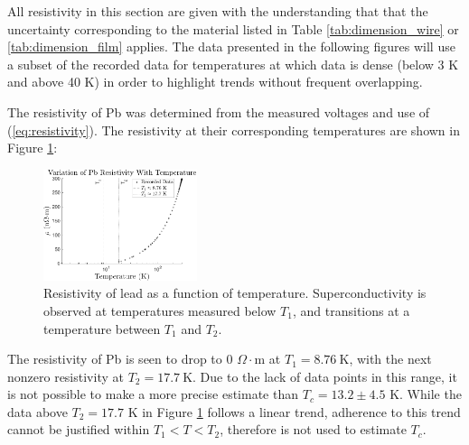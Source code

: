 \documentclass[prl,twocolumn,superscriptaddress,floatfix]{revtex4}
\begin{document}
All resistivity in this section are given with the understanding that that the uncertainty corresponding to the material listed in Table \ref{tab:dimension_wire} or \ref{tab:dimension_film} applies. The data presented in the following figures will use a subset of the recorded data for temperatures at which data is dense (below 3 K and above 40 K) in order to highlight trends without frequent overlapping.

The resistivity of Pb was determined from the measured voltages and use of (\ref{eq:resistivity}). The resistivity at their corresponding temperatures are shown in Figure \ref{fig:pb_resistivity}:

\begin{figure}[ht]
    \begin{center}
    \includegraphics[width = 0.4\textwidth]{pb_final.pdf}
    \caption{Resistivity of lead as a function of temperature. Superconductivity is observed at temperatures measured below $T_1$, and transitions at a temperature between $T_1$ and $T_2$.}
    \label{fig:pb_resistivity}
    \end{center}
\end{figure}
The resistivity of Pb is seen to drop to 0 $\Omega \cdot$m at  $T_1=8.76 \ \text{K}$, with the next nonzero resistivity at $T_2=17.7\ \text{K}$. Due to the lack of data points in this range, it is not possible to make a more precise estimate than $T_c=13.2 \pm 4.5$ K. While the data above $T_2=17.7$ K in Figure \ref{fig:pb_resistivity} follows a linear trend, adherence to this trend cannot be justified within $T_1<T<T_2$, therefore is not used to estimate $T_c.$
\end{document}

